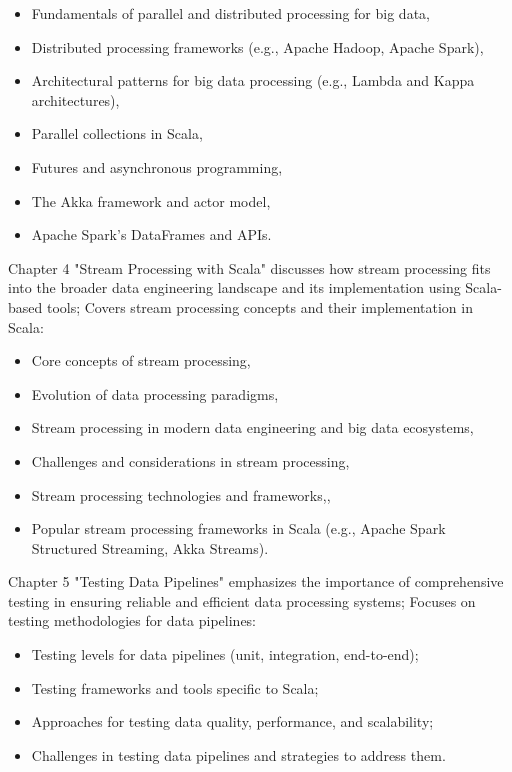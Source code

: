 \begin{itemize}
    \item Fundamentals of parallel and distributed processing for big data,
    \item Distributed processing frameworks (e.g., Apache Hadoop, Apache Spark),
    \item Architectural patterns for big data processing (e.g., Lambda and Kappa architectures),
    \item Parallel collections in Scala,
    \item Futures and asynchronous programming,
    \item The Akka framework and actor model,
    \item Apache Spark's DataFrames and APIs.
\end{itemize}

Chapter 4 "Stream Processing with Scala" discusses how stream processing fits into the broader data engineering landscape and its implementation using Scala-based tools; Covers stream processing concepts and their implementation in Scala:

\begin{itemize}
    \item Core concepts of stream processing,
    \item Evolution of data processing paradigms,
    \item Stream processing in modern data engineering and big data ecosystems,
    \item Challenges and considerations in stream processing,
    \item Stream processing technologies and frameworks,,
    \item Popular stream processing frameworks in Scala (e.g., Apache Spark Structured Streaming, Akka Streams).
\end{itemize}

Chapter 5 "Testing Data Pipelines" emphasizes the importance of comprehensive testing in ensuring reliable and efficient data processing systems; Focuses on testing methodologies for data pipelines: 

\begin{itemize}
    \item Testing levels for data pipelines (unit, integration, end-to-end);
    \item Testing frameworks and tools specific to Scala;
    \item Approaches for testing data quality, performance, and scalability;
    \item Challenges in testing data pipelines and strategies to address them.
\end{itemize}

